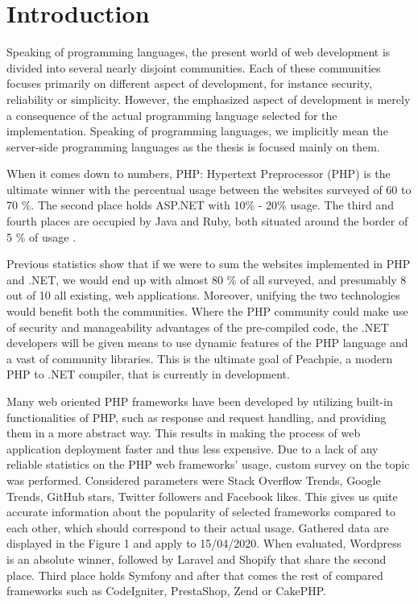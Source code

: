 \chapter*{Introduction}

Speaking of programming languages, the present world of web development is divided into several nearly disjoint communities. Each of these communities focuses primarily on different aspect of development, for instance security, reliability or simplicity. However, the emphasized aspect of development is merely a consequence of the actual programming language selected for the implementation. Speaking of programming languages, we implicitly mean the server-side programming languages as the thesis is focused mainly on them.

When it comes down to numbers, PHP: Hypertext Preprocessor (PHP) is the ultimate winner with the percentual usage between the websites surveyed of 60 to 70 \%. The second place holds ASP.NET with 10\% - 20\% usage. The third and fourth places are occupied by Java and Ruby, both situated around the border of 5 \% of usage \citep{w3techs.surveys, builwith.survey}. 

Previous statistics show that if we were to sum the websites implemented in PHP and .NET, we would end up with almost 80 \% of all surveyed, and presumably 8 out of 10 all existing, web applications. Moreover, unifying the two technologies would benefit both the communities. Where the PHP community could make use of security and manageability advantages of the pre-compiled code, the .NET developers will be given means to use dynamic features of the PHP language and a vast of community libraries. This is the ultimate goal of Peachpie, a modern PHP to .NET compiler, that is currently in development.

Many web oriented PHP frameworks have been developed by utilizing built-in functionalities of PHP, such as response and request handling, and providing them in a more abstract way. This results in making the process of web application deployment faster and thus less expensive. Due to a lack of any reliable statistics on the PHP web frameworks' usage, custom survey on the topic was performed. Considered parameters were Stack Overflow Trends, Google Trends, GitHub stars, Twitter followers and Facebook likes. This gives us quite accurate information about the popularity of selected frameworks compared to each other, which should correspond to their actual usage. Gathered data are displayed in the Figure 1 and apply to 15/04/2020. When evaluated, Wordpress is an absolute winner, followed by Laravel and Shopify that share the second place. Third place holds Symfony and after that comes the rest of compared frameworks such as CodeIgniter, PrestaShop, Zend or CakePHP.

